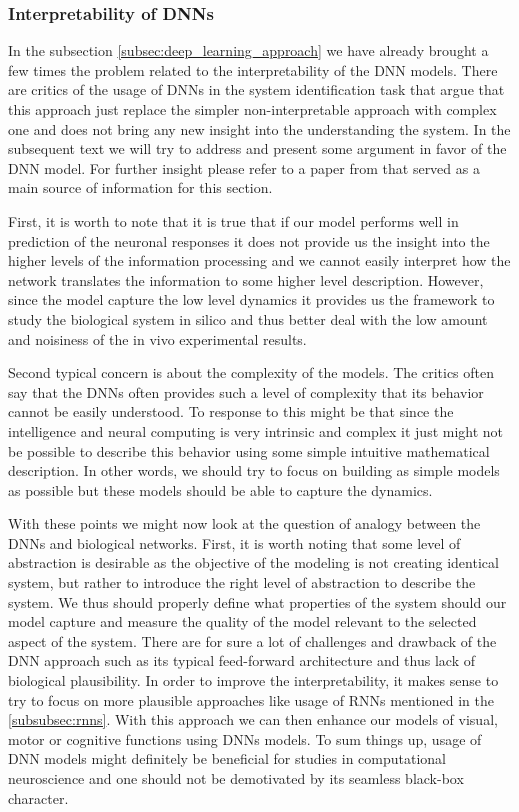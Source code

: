 \subsubsection{Interpretability of DNNs}
\label{subsubsec:interpretability_dnn}
In the subsection \ref{subsec:deep_learning_approach} we have already brought a few times the problem related to the interpretability of the DNN models. There are critics of the usage of DNNs in the system identification task that argue that this approach just replace the simpler non-interpretable approach with complex one and does not bring any new insight into the understanding the system. In the subsequent text we will try to address and present some argument in favor of the DNN model. For further insight please refer to a paper from \citet{Kriegeskorte2015dnn} that served as a main source of information for this section.

First, it is worth to note that it is true that if our model performs well in prediction of the neuronal responses it does not provide us the insight into the higher levels of the information processing and we cannot easily interpret how the network translates the information to some higher level description. However, since the model capture the low level dynamics it provides us the framework to study the biological system in silico and thus better deal with the low amount and noisiness of the in vivo experimental results.

Second typical concern is about the complexity of the models. The critics often say that the DNNs often provides such a level of complexity that its behavior cannot be easily understood. To response to this might be that since the intelligence and neural computing is very intrinsic and complex it just might not be possible to describe this behavior using some simple intuitive mathematical description. In other words, we should try to focus on building as simple models as possible but these models should be able to capture the dynamics.

With these points we might now look at the question of analogy between the DNNs and biological networks. First, it is worth noting that some level of abstraction is desirable as the objective of the modeling is not creating identical system, but rather to introduce the right level of abstraction to describe the system. We thus should properly define what properties of the system should our model capture and measure the quality of the model relevant to the selected aspect of the system. There are for sure a lot of challenges and drawback of the DNN approach such as its typical feed-forward architecture and thus lack of biological plausibility. In order to improve the interpretability, it makes sense to try to focus on more plausible approaches like usage of RNNs mentioned in the \ref{subsubsec:rnns}. With this approach we can then enhance our models of visual, motor or cognitive functions using DNNs models. To sum things up, usage of DNN models might definitely be beneficial for studies in computational neuroscience and one should not be demotivated by its seamless black-box character.

